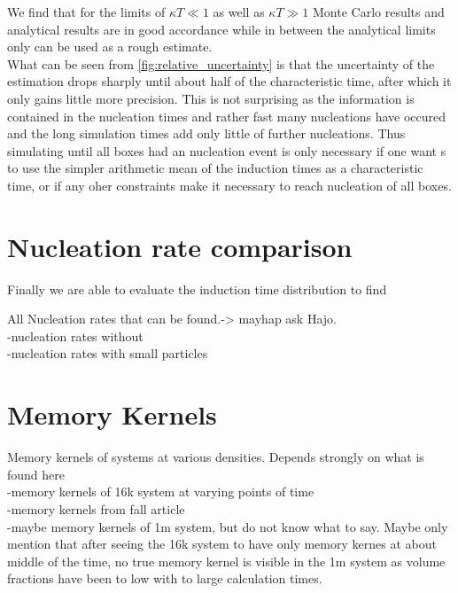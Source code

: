 We find that for the limits of $\kappa T \ll 1$ as well as $\kappa T \gg 1$ Monte Carlo results and analytical results are in good accordance while in between the analytical limits only can be used as a rough estimate.\\

What can be seen from \autoref{fig:relative_uncertainty} is that the uncertainty of the estimation drops sharply until about half of the characteristic time, after which it only gains little more precision. This is not surprising as the information is contained in the nucleation times and rather fast many nucleations have occured and the long simulation times add only little of further nucleations. Thus simulating until all boxes had an nucleation event is only necessary if one want s to use the simpler arithmetic mean of the induction times as a characteristic time, or if any oher constraints make it necessary to reach nucleation of all boxes.

\section{Nucleation rate comparison}
\label{sec:nucleation_rates}
Finally we are able to evaluate the induction time distribution to find 


All Nucleation rates that can be found.-> mayhap ask Hajo.\\
-nucleation rates without\\
-nucleation rates with small particles\\


\section{Memory Kernels}
\label{sec:memory_kernels}
Memory kernels of systems at various densities. Depends strongly on what is found here\\
-memory kernels of 16k system at varying points of time\\
-memory kernels from fall article\\
-maybe memory kernels of 1m system, but do not know what to say. Maybe only mention that after seeing the 16k system to have only memory kernes at about middle of the time, no true memory kernel is visible in the 1m system as volume fractions have been to low with to large calculation times.\\
 
